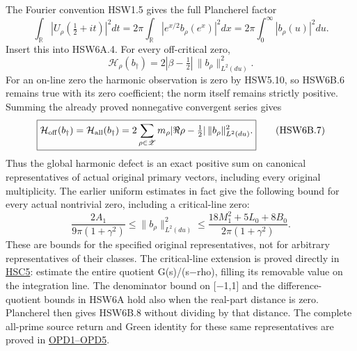 The Fourier convention HSW1.5 gives the full Plancherel factor \[
\int_{\mathbb R}|U_\rho(\tfrac12+it)|^2dt
=2\pi\int_{\mathbb R}|e^{x/2}b_\rho(e^x)|^2dx
=2\pi\int_0^\infty|b_\rho(u)|^2du.
\tag{HSW6B.5}
\] Insert this into HSW6A.4. For every off-critical zero, \[
\boxed{\mathcal H_\rho(b_\dagger)
=2|\beta-\tfrac12|\,\|b_\rho\|_{L^2(du)}^2.}
\tag{HSW6B.6}
\] For an on-line zero the harmonic observation is zero by HSW5.10, so
HSW6B.6 remains true with its zero coefficient; the norm itself remains
strictly positive. Summing the already proved nonnegative convergent
series gives \[
\boxed{
\mathcal H_{\rm off}(b_\dagger)
=\mathcal H_{\rm all}(b_\dagger)
=2\sum_{\rho\in\mathscr Z}
m_\rho|\Re\rho-\tfrac12|\,\|b_\rho\|_{L^2(du)}^2.}
\tag{HSW6B.7}
\] Thus the global harmonic defect is an exact positive sum on canonical
representatives of actual original primary vectors, including every
original multiplicity. The earlier uniform estimates in fact give the
following bound for every actual nontrivial zero, including a
critical-line zero: \[
\frac{2A_1}{9\pi(1+\gamma^2)}
\le\|b_\rho\|_{L^2(du)}^2
\le\frac{18M_1^2+5L_0+8B_0}{2\pi(1+\gamma^2)}.
\tag{HSW6B.8}
\] These are bounds for the specified original representatives, not for
arbitrary representatives of their classes. The critical-line extension
is proved directly in
\href{https://github.com/KokunoYumeto/zeta-function-research-reader/blob/main/workbenches/splitzero-tandem/continuations/20260925-full-source-tensor-and-original-divisor/counterfactual/HSW_INDEPENDENT_CHECK.md}{HSC5}:
estimate the entire quotient G(s)/(s−rho), filling its removable value
on the integration line. The denominator bound on {[}−1,1{]} and the
difference-quotient bounds in HSW6A hold also when the real-part
distance is zero. Plancherel then gives HSW6B.8 without dividing by that
distance. The complete all-prime source return and Green identity for
these same representatives are proved in
\href{https://github.com/KokunoYumeto/zeta-function-research-reader/blob/main/workbenches/splitzero-tandem/continuations/20260925-full-source-tensor-and-original-divisor/counterfactual/ORIGINAL_PRIME_DILATION_FORCING_IDENTITY.md}{OPD1--OPD5}.

